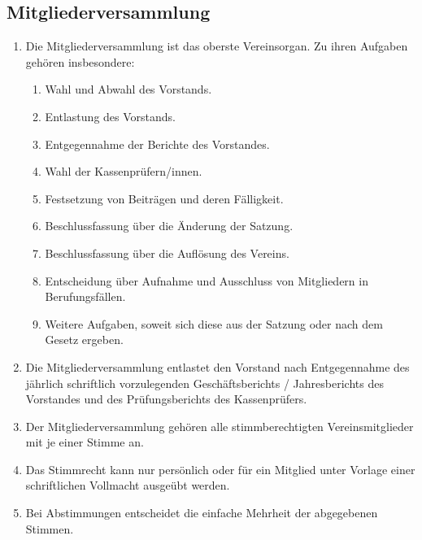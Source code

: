 \documentclass[12pt,a4paper,draft]{article}
\begin{document}
\subsection{Mitgliederversammlung} %
\begin{enumerate}
\item Die Mitgliederversammlung ist das oberste Vereinsorgan. Zu ihren Aufgaben 
gehören insbesondere:

\begin{enumerate}
\item Wahl und Abwahl des Vorstands. %

\item Entlastung des Vorstands.

\item Entgegennahme der Berichte des Vorstandes.

\item Wahl der Kassenprüfern/innen.

\item Festsetzung von Beiträgen und deren Fälligkeit.

\item Beschlussfassung über die Änderung der Satzung.

\item Beschlussfassung über die Auflösung des Vereins.

\item Entscheidung über Aufnahme und Ausschluss von Mitgliedern in 
Berufungsfällen.

\item Weitere Aufgaben, soweit sich diese aus der Satzung oder nach dem Gesetz 
ergeben.
\end{enumerate}

\item Die Mitgliederversammlung entlastet den Vorstand nach Entgegennahme des 
jährlich schriftlich vorzulegenden Geschäftsberichts / Jahresberichts des 
Vorstandes und des Prüfungsberichts des Kassenprüfers.

\item Der Mitgliederversammlung gehören alle stimmberechtigten 
Vereinsmitglieder mit je einer Stimme an.

\item Das Stimmrecht kann nur persönlich oder für ein Mitglied unter Vorlage 
einer schriftlichen Vollmacht ausgeübt werden.

\item Bei Abstimmungen entscheidet die einfache Mehrheit der abgegebenen 
Stimmen.


\end{enumerate}
\end{document}
